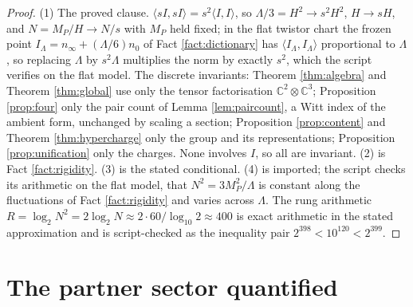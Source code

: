 \documentclass[11pt]{article}
\theoremstyle{definition}
\newcommand{\C}{\mathbb{C}}
\newcommand{\ip}[2]{\langle #1, #2\rangle}
\begin{document}
\begin{proof}
(1) The proved clause. $\ip{sI}{sI} = s^{2}\ip{I}{I}$, so $\Lambda/3 = H^{2} \to s^{2}H^{2}$, $H \to sH$, and $N = M_{P}/H \to N/s$ with $M_{P}$ held fixed; in the flat twistor chart the frozen point $I_{\Lambda} = n_{\infty} + (\Lambda/6)n_{0}$ of Fact \ref{fact:dictionary} has $\ip{I_{\Lambda}}{I_{\Lambda}}$ proportional to $\Lambda$, so replacing $\Lambda$ by $s^{2}\Lambda$ multiplies the norm by exactly $s^{2}$, which the script verifies on the flat model. The discrete invariants: Theorem \ref{thm:algebra} and Theorem \ref{thm:global} use only the tensor factorisation $\C^{2} \otimes \C^{3}$; Proposition \ref{prop:four} only the pair count of Lemma \ref{lem:paircount}, a Witt index of the ambient form, unchanged by scaling a section; Proposition \ref{prop:content} and Theorem \ref{thm:hypercharge} only the group and its representations; Proposition \ref{prop:unification} only the charges. None involves $I$, so all are invariant. (2) is Fact \ref{fact:rigidity}. (3) is the stated conditional. (4) is imported; the script checks its arithmetic on the flat model, that $N^{2} = 3M_{P}^{2}/\Lambda$ is constant along the fluctuations of Fact \ref{fact:rigidity} and varies across $\Lambda$. The rung arithmetic $R = \log_{2}N^{2} = 2\log_{2}N \approx 2 \cdot 60/\log_{10}2 \approx 400$ is exact arithmetic in the stated approximation and is script-checked as the inequality pair $2^{398} < 10^{120} < 2^{399}$.
\end{proof}

\section{The partner sector quantified}\label{sec:partner}
\end{document}
